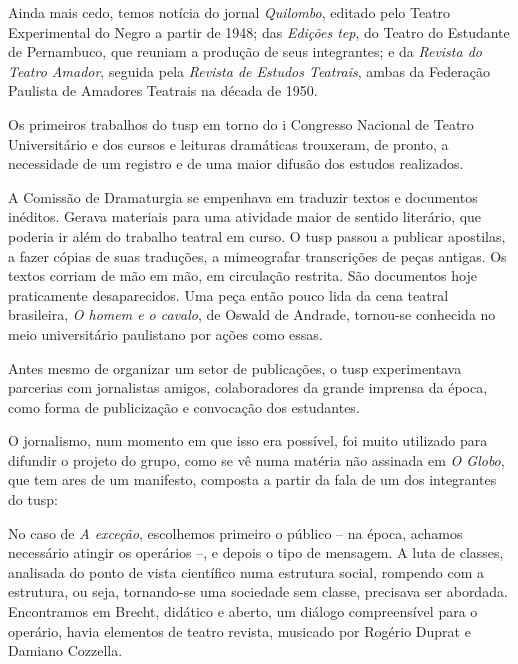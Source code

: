 {Ainda mais cedo, temos notícia do jornal {\it Quilombo}, editado pelo
Teatro Experimental do Negro a partir de 1948; das {\it Edições {\sc tep}}, do
Teatro do Estudante de Pernambuco, que reuniam a produção de seus
integrantes; e da {\it Revista do Teatro Amador}, seguida pela
{\it Revista de Estudos Teatrais}, ambas da Federação Paulista de
Amadores Teatrais na década de 1950.

Os primeiros trabalhos do {\sc tusp} em torno do {\sc i} Congresso Nacional de
Teatro Universitário e dos cursos e leituras dramáticas trouxeram, de
pronto, a necessidade de um registro e de uma maior difusão dos estudos
realizados.

A Comissão de Dramaturgia se empenhava em traduzir textos e
documentos inéditos. Gerava materiais para uma atividade maior de
sentido literário, que poderia ir além do trabalho teatral em curso. O
{\sc tusp} passou a publicar apostilas, a fazer cópias de suas traduções, a
mimeografar transcrições de peças antigas. Os textos corriam de mão
em mão, em circulação restrita. São documentos hoje praticamente
desaparecidos. Uma peça então pouco lida da cena teatral brasileira,
{\it O homem e o cavalo}, de Oswald de Andrade, tornou-se conhecida no
meio universitário paulistano por ações como essas.


Antes mesmo de organizar um setor de publicações, o {\sc tusp}
experimentava parcerias com jornalistas amigos, colaboradores da grande
imprensa da época, como forma de publicização e convocação dos
estudantes.

O jornalismo, num momento em que isso era possível, foi muito utilizado
para difundir o projeto do grupo, como se vê numa matéria não assinada
em {\it O Globo}, que tem ares de um manifesto, composta a partir da
fala de um dos integrantes do {\sc tusp}:

\startblockquote
No caso de {\it A exceção}, escolhemos primeiro o público -- na época,
achamos necessário atingir os operários --, e depois o tipo de mensagem.
A luta de classes, analisada do ponto de vista científico numa estrutura
social, rompendo com a estrutura, ou seja, tornando-se uma sociedade sem
classe, precisava ser abordada. Encontramos em Brecht, didático e
aberto, um diálogo compreensível para o operário, havia elementos de
teatro revista, musicado por Rogério Duprat e Damiano Cozzella.

}
